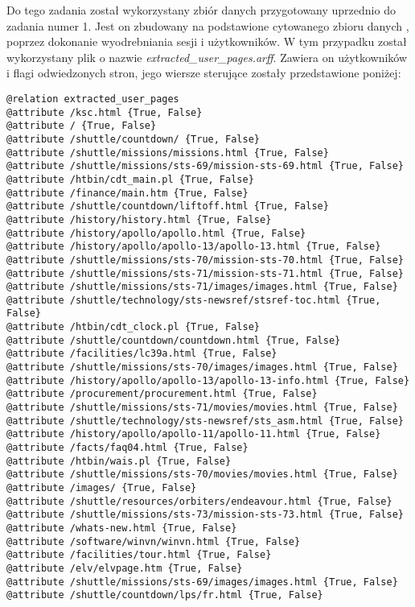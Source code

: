\documentclass{classrep}
\begin{document}
    \label{dataset_description} {
        Do tego zadania został wykorzystany zbiór danych przygotowany uprzednio do
        zadania numer 1. Jest on zbudowany na podstawione cytowanego zbioru danych
        \cite{dataset}, poprzez dokonanie wyodrebniania sesji i użytkowników. W tym
        przypadku został wykorzystany plik o nazwie \textit{extracted\_user\_pages.arff}.
        Zawiera on użytkowników i flagi odwiedzonych stron, jego wiersze sterujące
        zostały przedstawione poniżej:
        \begin{lstlisting}
@relation extracted_user_pages
@attribute /ksc.html {True, False}
@attribute / {True, False}
@attribute /shuttle/countdown/ {True, False}
@attribute /shuttle/missions/missions.html {True, False}
@attribute /shuttle/missions/sts-69/mission-sts-69.html {True, False}
@attribute /htbin/cdt_main.pl {True, False}
@attribute /finance/main.htm {True, False}
@attribute /shuttle/countdown/liftoff.html {True, False}
@attribute /history/history.html {True, False}
@attribute /history/apollo/apollo.html {True, False}
@attribute /history/apollo/apollo-13/apollo-13.html {True, False}
@attribute /shuttle/missions/sts-70/mission-sts-70.html {True, False}
@attribute /shuttle/missions/sts-71/mission-sts-71.html {True, False}
@attribute /shuttle/missions/sts-71/images/images.html {True, False}
@attribute /shuttle/technology/sts-newsref/stsref-toc.html {True, False}
@attribute /htbin/cdt_clock.pl {True, False}
@attribute /shuttle/countdown/countdown.html {True, False}
@attribute /facilities/lc39a.html {True, False}
@attribute /shuttle/missions/sts-70/images/images.html {True, False}
@attribute /history/apollo/apollo-13/apollo-13-info.html {True, False}
@attribute /procurement/procurement.html {True, False}
@attribute /shuttle/missions/sts-71/movies/movies.html {True, False}
@attribute /shuttle/technology/sts-newsref/sts_asm.html {True, False}
@attribute /history/apollo/apollo-11/apollo-11.html {True, False}
@attribute /facts/faq04.html {True, False}
@attribute /htbin/wais.pl {True, False}
@attribute /shuttle/missions/sts-70/movies/movies.html {True, False}
@attribute /images/ {True, False}
@attribute /shuttle/resources/orbiters/endeavour.html {True, False}
@attribute /shuttle/missions/sts-73/mission-sts-73.html {True, False}
@attribute /whats-new.html {True, False}
@attribute /software/winvn/winvn.html {True, False}
@attribute /facilities/tour.html {True, False}
@attribute /elv/elvpage.htm {True, False}
@attribute /shuttle/missions/sts-69/images/images.html {True, False}
@attribute /shuttle/countdown/lps/fr.html {True, False}
        \end{lstlisting}
    }
\end{document}
